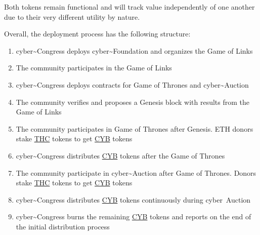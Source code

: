 \documentclass[8pt,oneside]{amsart}
\begin{document}
Both tokens remain functional and will track value independently of one another due to their very different utility by nature.

Overall, the deployment process has the following structure:

\begin{enumerate}
 \item cyber\~{}Congress deploys cyber\~{}Foundation and organizes the Game of Links
 \item The community participates in the Game of Links
 \item cyber\~{}Congress deploys contracts for Game of Thrones and cyber\~{}Auction
 \item The community verifies and proposes a Genesis block with results from the Game of Links
 \item The community participates in Game of Thrones after Genesis. ETH donors stake {\hyperref[thc]{THC}} tokens to get {\hyperref[cyb]{CYB}} tokens
 \item cyber\~{}Congress distributes {\hyperref[cyb]{CYB}} tokens after the Game of Thrones
 \item The community participate in cyber\~{}Auction after Game of Thrones. Donors stake {\hyperref[thc]{THC}} tokens to get {\hyperref[cyb]{CYB}} tokens
 \item cyber\~{}Congress distributes {\hyperref[cyb]{CYB}} tokens continuously during cyber~Auction
 \item cyber\~{}Congress burns the remaining {\hyperref[cyb]{CYB}} tokens and reports on the end of the initial distribution process
\end{enumerate}
\end{document}
